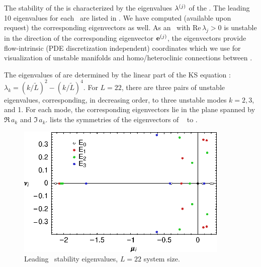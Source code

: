 The stability of the {\eqva} is characterized by the eigenvalues
$\eigExp[j]$ of the \stabmat.  The leading 10 eigenvalues for each
\eqv\ are listed in . We have computed (available upon request)
the corresponding eigenvectors as well. As an \eqv\ with $\mathrm{Re}\,
\lambda_j > 0$ is unstable in the direction of the corresponding
eigenvector ${\mathbf e}^{(j)}$, the eigenvectors provide flow-intrinsic
(PDE discretization independent) coordinates which we use for visualization
of unstable manifolds and homo/heteroclinic connections between
\eqva.

The eigenvalues of  are determined by the linear part of the KS
equation : $\lambda_k=(k/\tilde{L})^2-(k/\tilde{L})^4$.
For $L=22$, there are three pairs of unstable eigenvalues, corresponding,
in decreasing order, to three unstable modes $k=2,3$, and 1.  For each
mode, the corresponding eigenvectors lie in the plane spanned by
$\Re \, a_k$ and $\Im \, a_k$. 
lists the symmetries of the eigenvectors of
\eqva\  to .

\begin{figure}[h!t]
\begin{center}
 \includegraphics[width=4in]{../figs/L22-eqvaEigenvalues}
\end{center}
\caption[Leading  \eqv\ stability eigenvalues]{
Leading  \eqv\ stability eigenvalues,
$L=22$ system size.
}
\label{f:KS22EkEigs}
\end{figure}

